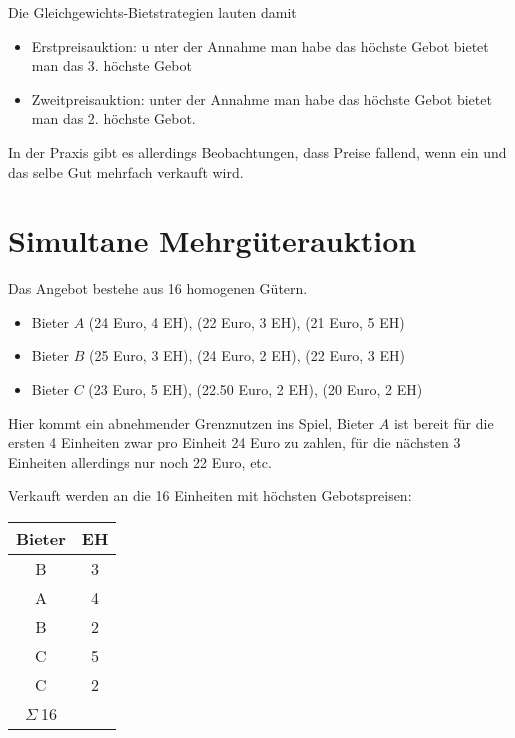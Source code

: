 \documentclass[12pt]{extreport} %
\theoremstyle{named}
\theoremstyle{itshape}
\theoremstyle{normal}
\begin{document}
Die Gleichgewichts-Bietstrategien lauten damit
\begin{itemize}
	\item Erstpreisauktion: u nter der Annahme man habe das höchste Gebot bietet man das 3. höchste Gebot
	\item Zweitpreisauktion: unter der Annahme man habe das höchste Gebot bietet man das 2. höchste Gebot.
\end{itemize}

In der Praxis gibt es allerdings Beobachtungen, dass Preise fallend, wenn ein und das selbe Gut mehrfach verkauft wird. ~\newpage

\section{Simultane Mehrgüterauktion}

Das Angebot bestehe aus 16 homogenen Gütern.

\begin{itemize}
	\item Bieter $A$ (24 Euro, 4 EH), (22 Euro, 3 EH), (21 Euro, 5 EH)
	\item Bieter $B$ (25 Euro, 3 EH), (24 Euro, 2 EH), (22 Euro, 3 EH)
	\item Bieter $C$ (23 Euro, 5 EH), (22.50 Euro, 2 EH), (20 Euro, 2 EH)
\end{itemize}
Hier kommt ein abnehmender Grenznutzen ins Spiel, Bieter $A$ ist bereit für die ersten 4 Einheiten zwar pro Einheit 24 Euro zu zahlen, für die nächsten 3 Einheiten allerdings nur noch 22 Euro, etc.

Verkauft werden an die 16 Einheiten mit höchsten Gebotspreisen: ~
\begin{tabular}{c|c}
  Bieter & EH \\
  \hline
  B & 3 \\
  A & 4 \\
  B & 2 \\
  C & 5 \\
  C & 2 \\
  \hline
  $\Sigma ~$16 & ~
\end{tabular} ~\\
\end{document}
